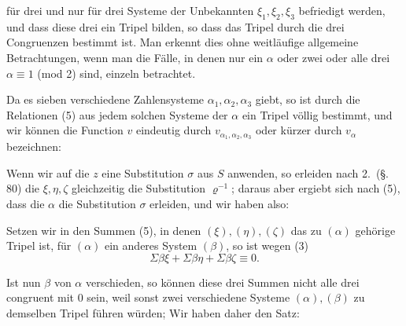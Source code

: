 
für drei und nur für drei Systeme der Unbekannten $\xi_1, \xi_2, \xi_3$ befriedigt werden, und dass diese drei ein Tripel bilden, so dass das Tripel durch die drei Congruenzen
bestimmt ist. Man erkennt dies ohne weitläufige allgemeine Betrachtungen, wenn man die Fälle, in denen nur ein $\alpha$ oder zwei oder alle drei $\alpha \equiv 1$ (mod 2) sind, einzeln betrachtet.

Da es sieben verschiedene Zahlensysteme $\alpha_1, \alpha_2, \alpha_3$ giebt, so ist durch die Relationen (5) aus jedem solchen Systeme der $\alpha$ ein Tripel völlig bestimmt, und wir können die Function $v$ eindeutig durch $v_{\alpha_1,\alpha_2,\alpha_3}$ oder kürzer durch $v_\alpha$ bezeichnen:


Wenn wir auf die $z$ eine Substitution $\sigma$ aus $S$ anwenden, so erleiden nach 2.\ (\S.\,80) die $\xi, \eta, \zeta$ gleichzeitig die Substitution $\varrho^{-1}$; daraus aber ergiebt sich nach (5), dass die $\alpha$ die Substitution $\sigma$ erleiden, und wir haben also:


Setzen wir in den Summen (5), in denen $(\xi), (\eta), (\zeta)$ das zu $(\alpha)$ gehörige Tripel ist, für $(\alpha)$ ein anderes System $(\beta)$, so ist wegen (3)
\[
\Sigma \beta\xi + \Sigma \beta\eta + \Sigma \beta\zeta \equiv 0.
\]

Ist nun $\beta$ von $\alpha$ verschieden, so können diese drei Summen nicht alle drei congruent mit 0 sein, weil sonst zwei verschiedene Systeme $(\alpha), (\beta)$ zu demselben Tripel führen würden;  Wir haben daher den Satz:

